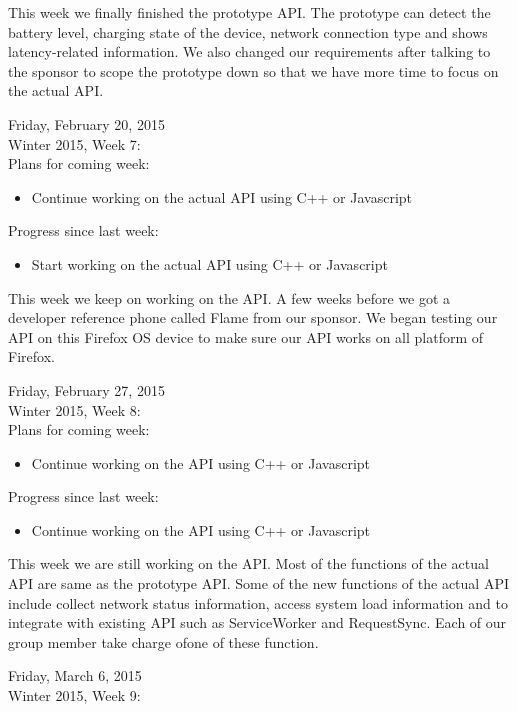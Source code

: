 This week we finally finished the prototype API​.​​ The prototype can detect the battery level, charging state of the device, network connection type and shows latency-related information. We also changed our requirements after talking to the sponsor to scope the prototype down so that ​we have more time to focus on the actual​ API.​​​​

Friday, February 20, 2015 \\
Winter 2015, Week 7: \\

Plans for coming week:
\begin{itemize}
\item Continue working on the actual API using C++ or Javascript
\end{itemize}

Progress since last week:​
\begin{itemize}
\item Start working on the actual API using C++ or Javascript
​​​\end{itemize}

This week we keep on working on the API. A few weeks before we got a developer reference phone called Flame from our sponsor. We began testing our API on this Firefox OS device​​ to make sure our API works on all platform of Firefox.

Friday, February 27, 2015 \\
​Winter 2015, Week 8: \\

Plans for coming week:
\begin{itemize}
\item Continue working on the API using C++ or Javascript
\end{itemize}

Progress since last week:​
\begin{itemize}
\item Continue working on the API using C++ or Javascript​
​​​\end{itemize}

This week ​we are still working on the API. ​​Most of the functions of the actual API are same as the prototype API. Some of the new functions of the actual API include collect network status information, access system load information and to integrate with existing API such as ServiceWorker and RequestSync. Each of our group member take charge of ​one of these function.

Friday, March 6, 2015 \\
Winter 2015, Week 9: \\

